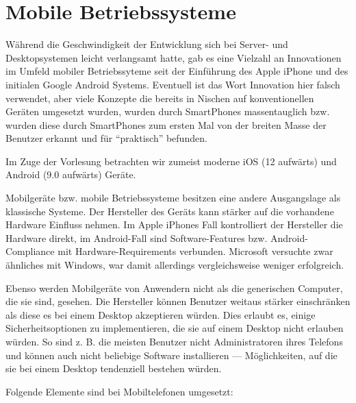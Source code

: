 \part{Mobile Betriebssysteme}

Während die Geschwindigkeit der Entwicklung sich bei Server- und Desktopsystemen leicht verlangsamt hatte, gab es eine Vielzahl an Innovationen im Umfeld mobiler Betriebssyteme seit der Einführung des Apple iPhone und des initialen Google Android Systems. Eventuell ist das Wort Innovation hier falsch verwendet, aber viele Konzepte die bereits in Nischen auf konventionellen Geräten umgesetzt wurden, wurden durch SmartPhones massentauglich bzw. wurden diese durch SmartPhones zum ersten Mal von der breiten Masse der Benutzer erkannt und für ``praktisch'' befunden.

Im Zuge der Vorlesung betrachten wir zumeist moderne iOS (12 aufwärts) und Android (9.0 aufwärts) Geräte.

Mobilgeräte bzw. mobile Betriebssysteme besitzen eine andere Ausgangslage als klassische Systeme. Der Hersteller des Geräts kann stärker auf die vorhandene Hardware Einfluss nehmen. Im Apple iPhones Fall kontrolliert der Hersteller die Hardware direkt, im Android-Fall sind Software-Features bzw. Android-Compliance mit Hardware-Requirements verbunden. Microsoft versuchte zwar ähnliches mit Windows, war damit allerdings vergleichsweise weniger erfolgreich.

Ebenso werden Mobilgeräte von Anwendern nicht als die generischen Computer, die sie sind, gesehen. Die Hersteller können Benutzer weitaus stärker einschränken als diese es bei einem Desktop akzeptieren würden. Dies erlaubt es, einige Sicherheitsoptionen zu implementieren, die sie auf einem Desktop nicht erlauben würden. So sind z. B. die meisten Benutzer nicht Administratoren ihres Telefons und können auch nicht beliebige Software installieren --- Möglichkeiten, auf die sie bei einem Desktop tendenziell bestehen würden.

Folgende Elemente sind bei Mobiltelefonen umgesetzt:


